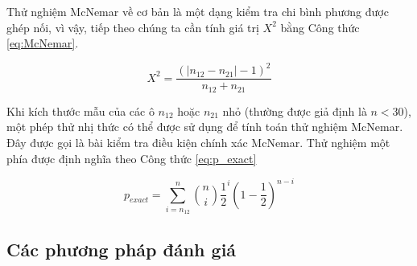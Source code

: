 \documentclass[../the.tex]{subfiles}
\begin{document}
Thử nghiệm McNemar về cơ bản là một dạng kiểm tra chi bình phương được ghép nối, vì vậy, tiếp theo chúng ta cần tính giá trị $X^2$ bằng Công thức \ref{eq:McNemar}.

\begin{equation}
    X^2 = \frac{(|n_{12} - n_{21}| - 1)^2}{n_{12} + n_{21}}
    \label{eq:McNemar}
\end{equation}

Khi kích thước mẫu của các ô $n_{12}$ hoặc $n_{21}$ nhỏ (thường được giả định là $n < 30$), một phép thử nhị thức có thể được sử dụng để tính toán thử nghiệm McNemar. Đây được gọi là bài kiểm tra điều kiện chính xác McNemar. Thử nghiệm một phía được định nghĩa theo Công thức \ref{eq:p_exact}

\begin{equation}
    p_{exact} = \sum_{i=n_{12}}^{n} \binom{n}{i} \frac{1}{2}^i (1 - \frac{1}{2})^{n-i}
    \label{eq:p_exact}
\end{equation}

\subsection{Các phương pháp đánh giá}
\end{document}
